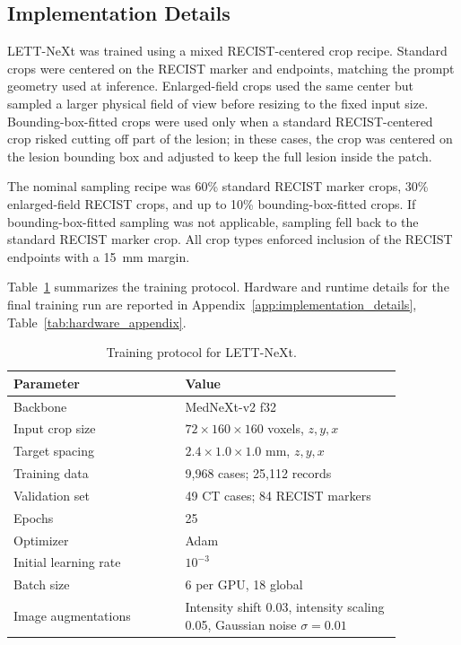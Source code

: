 \subsection{Implementation Details}
\label{sec:implementation_details}

LETT-NeXt was trained using a mixed RECIST-centered crop recipe. Standard crops were centered on the RECIST marker and endpoints, matching the prompt geometry used at inference. Enlarged-field crops used the same center but sampled a larger physical field of view before resizing to the fixed input size. Bounding-box-fitted crops were used only when a standard RECIST-centered crop risked cutting off part of the lesion; in these cases, the crop was centered on the lesion bounding box and adjusted to keep the full lesion inside the patch.

The nominal sampling recipe was 60\% standard RECIST marker crops, 30\% enlarged-field RECIST crops, and up to 10\% bounding-box-fitted crops. If bounding-box-fitted sampling was not applicable, sampling fell back to the standard RECIST marker crop. All crop types enforced inclusion of the RECIST endpoints with a \SI{15}{\milli\metre} margin.

Table~\ref{tab:training_protocol} summarizes the training protocol. Hardware and runtime details for the final training run are reported in Appendix~\ref{app:implementation_details}, Table~\ref{tab:hardware_appendix}.

\begin{table}[!htbp]
\centering
\small
\caption{Training protocol for LETT-NeXt.}
\label{tab:training_protocol}
\begin{tabular}{p{0.38\linewidth} p{0.48\linewidth}}
\toprule
\textbf{Parameter} & \textbf{Value} \\
\midrule
Backbone & MedNeXt-v2 f32 \\
Input crop size & \(72 \times 160 \times 160\) voxels, \(z,y,x\) \\
Target spacing & \(2.4 \times 1.0 \times 1.0\) mm, \(z,y,x\) \\
Training data & 9,968 cases; 25,112 records \\
Validation set & 49 CT cases; 84 RECIST markers \\
Epochs & 25 \\
Optimizer & Adam \\
Initial learning rate & \(10^{-3}\) \\
Batch size & 6 per GPU, 18 global \\
Image augmentations & Intensity shift 0.03, intensity scaling 0.05, Gaussian noise \(\sigma=0.01\) \\
\bottomrule
\end{tabular}
\end{table}

